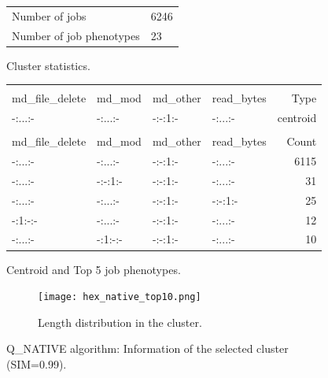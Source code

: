 \documentclass{jhps}
\begin{document}
\begin{figure}
	\begin{subtable}{\textwidth}
		\centering
		\begin{tabular}{ll}
			Number of jobs & 6246 \\
			Number of job phenotypes & 23 \\
		\end{tabular}
		\caption{Cluster statistics.}
		\label{cluster:hex_native:stats}
	\end{subtable}
	\medskip
	\begin{subtable}{\textwidth}
		\centering
		\begin{tiny}
      \begin{tabular}{llll|r}
        \rowcolor{tblhead}
        \multicolumn{4}{l|}{Q-coding} &            \\
        \rowcolor{tblhead}
        md\_file\_delete & md\_mod & md\_other & read\_bytes & Type \\ 
        \hline
        -:...:-               & -:...:-      & -:-:1:-        & -:...:-          & centroid \\ 
        \multicolumn{5}{l}{} \\
        \rowcolor{tblhead}
        md\_file\_delete & md\_mod & md\_other & read\_bytes & Count    \\ 
        \hline
        -:...:-               & -:...:-      & -:-:1:-        & -:...:-          & 6115     \\ 
        -:...:-               & -:-:1:-      & -:-:1:-        & -:...:-          & 31       \\ 
        -:...:-               & -:...:-      & -:-:1:-        & -:-:1:-          & 25       \\ 
        -:1:-:-               & -:...:-      & -:-:1:-        & -:...:-          & 12       \\ 
        -:...:-               & -:1:-:-      & -:-:1:-        & -:...:-          & 10       \\ 
      \end{tabular}
		\end{tiny}
		\caption{Centroid and Top 5 job phenotypes.}
		\label{cluster:hex_native:top_jobs}
	\end{subtable}
	\medskip
	\begin{subfigure}{\textwidth}
		\centering
		\texttt{[image: hex\_native\_top10.png]}
		\caption{Length distribution in the cluster.}
		\label{cluster:hex_native:length}
	\end{subfigure}
	\caption{Q\_NATIVE algorithm: Information of the selected cluster (SIM=0.99).}
	\label{cluster:hex_native}
\end{figure}
\end{document}
